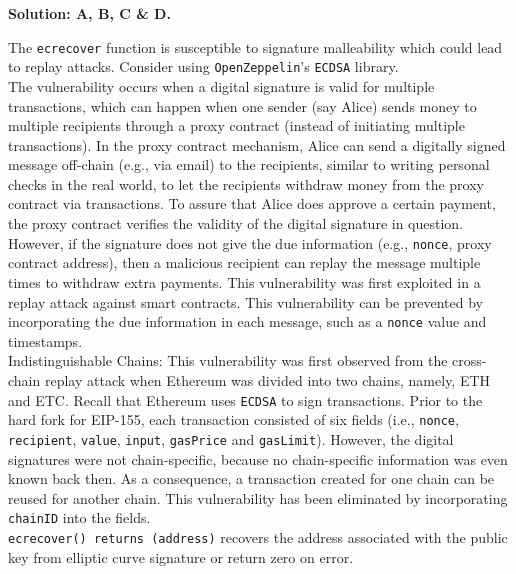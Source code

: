 \textbf{Solution: A, B, C \& D.}

The \verb|ecrecover| function is susceptible to signature malleability which could lead to replay attacks.
Consider using \verb|OpenZeppelin|'s \verb|ECDSA| library.\\


The vulnerability occurs when a digital signature is valid for multiple transactions, which can happen when one sender (say Alice) sends money to multiple recipients through a proxy contract (instead of initiating multiple transactions).
In the proxy contract mechanism, Alice can send a digitally signed message off-chain (e.g., via email) to the recipients, similar to writing personal checks in the real world, to let the recipients withdraw money from the proxy contract via transactions.
To assure that Alice does approve a certain payment, the proxy contract verifies the validity of the digital signature in question.
However, if the signature does not give the due information (e.g., \verb|nonce|, proxy contract address), then a malicious recipient can replay the message multiple times to withdraw extra payments.
This vulnerability was first exploited in a replay attack against smart contracts.
This vulnerability can be prevented by incorporating the due information in each message, such as a \verb|nonce| value and timestamps.\\

Indistinguishable Chains: This vulnerability was first observed from the cross-chain replay attack when Ethereum was divided into two chains, namely, ETH and ETC.
Recall that Ethereum uses \verb|ECDSA| to sign transactions.
Prior to the hard fork for EIP-155, each transaction consisted of six fields (i.e., \verb|nonce|, \verb|recipient|, \verb|value|, \verb|input|, \verb|gasPrice| and \verb|gasLimit|).
However, the digital signatures were not chain-specific, because no chain-specific information was even known back then.
As a consequence, a transaction created for one chain can be reused for another chain.
This vulnerability has been eliminated by incorporating \verb|chainID| into the fields.\\

\verb|ecrecover() returns (address)| recovers the address associated with the public key from elliptic curve signature or return zero on error.\\

